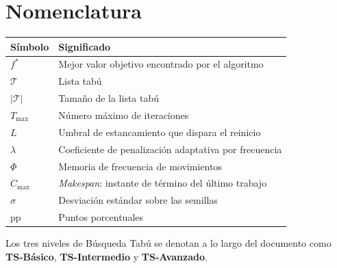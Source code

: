 \vspace{2em}

\section*{Nomenclatura}

\begin{tabular}{lp{11cm}}
\toprule
\textbf{Símbolo} & \textbf{Significado} \\
\midrule
$f^*$            & Mejor valor objetivo encontrado por el algoritmo \\
$\mathcal{T}$    & Lista tabú \\
$|\mathcal{T}|$  & Tamaño de la lista tabú \\
$T_{\max}$       & Número máximo de iteraciones \\
$L$              & Umbral de estancamiento que dispara el reinicio \\
$\lambda$        & Coeficiente de penalización adaptativa por frecuencia \\
$\Phi$           & Memoria de frecuencia de movimientos \\
$C_{\max}$       & \emph{Makespan}: instante de término del último trabajo \\
$\sigma$         & Desviación estándar sobre las semillas \\
pp               & Puntos porcentuales \\
\bottomrule
\end{tabular}

\vspace{1.5em}

\noindent Los tres niveles de Búsqueda Tabú se denotan a lo largo del documento
como \textbf{TS-Básico}, \textbf{TS-Intermedio} y \textbf{TS-Avanzado}.
